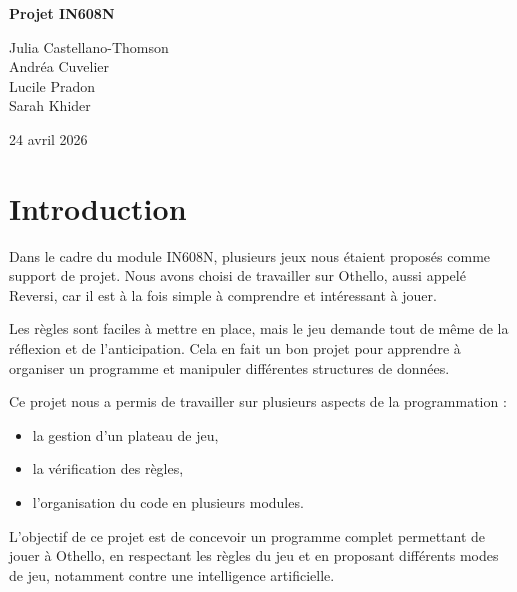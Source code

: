 \documentclass{article}
\date{}
\begin{document}
\begin{titlepage}
    \null
    \vfill
    \begin{center}
    {\LARGE \textbf{Projet IN608N} \par}
    \vspace{1.5cm}
    {\large Julia Castellano-Thomson \\ 
    Andréa Cuvelier \\ 
    Lucile Pradon \\ 
    Sarah Khider \par}
    \vspace{1.5cm}
    {\large 24 avril 2026 \par}
    \end{center}
    \vfill
\end{titlepage}


\tableofcontents
\newpage

\section{\textbf{Introduction}}

\noindent
Dans le cadre du module IN608N, plusieurs jeux nous étaient proposés comme support de projet. Nous avons choisi de travailler sur Othello, aussi appelé Reversi, car il est à la fois simple à comprendre et intéressant à jouer.

\vspace{0.3cm}

Les règles sont faciles à mettre en place, mais le jeu demande tout de même de la réflexion et de l'anticipation. Cela en fait un bon projet pour apprendre à organiser un programme et manipuler différentes structures de données.

\vspace{0.3cm}

Ce projet nous a permis de travailler sur plusieurs aspects de la programmation :
\begin{itemize}
    \item la gestion d'un plateau de jeu,
    \item la vérification des règles,
    \item l'organisation du code en plusieurs modules.
\end{itemize}

\vspace{0.3cm}

L'objectif de ce projet est de concevoir un programme complet permettant de jouer à Othello, en respectant les règles du jeu et en proposant différents modes de jeu, notamment contre une intelligence artificielle.
\end{document}
